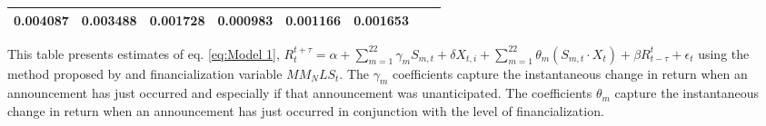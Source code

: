 \begin{sidewaystable}
{\begin{tabular}{@{}lllllllllllll@{}}
0.004087 }                                                 & \multicolumn{2}{c}{ 0.003488 }                                                 & \multicolumn{2}{c}{ 0.001728 }                                                 & \multicolumn{2}{c}{ 0.000983 }                                                 & \multicolumn{2}{c}{ 0.001166 }                                                   & \multicolumn{2}{c}{ 0.001653 }                                                 \\ \bottomrule 
\end{tabular}
}
\begin{tablenotes}\item 
    \singlespacing
    \footnotesize
    This table presents estimates of eq. \ref{eq:Model 1}, $R_{t}^{t+\tau}=\alpha+\sum_{m=1}^{22} \gamma_m S_{m,t}+ \delta X_{t,i} + \sum_{m=1}^{22} \theta_m (S_{m,t} \cdot X_t)+\beta R_{t-\tau}^{t}+\epsilon_{t}$ using the method proposed by \citet{kurov2019price} and financialization variable $MM_NLS_t$. The $\gamma_m$ coefficients capture the instantaneous change in return when an announcement has just occurred and especially if that announcement was unanticipated. The coefficients $\theta_m$ capture the instantaneous change in return when an announcement has just occurred in conjunction with the level of financialization.
\end{tablenotes}
\end{sidewaystable}


